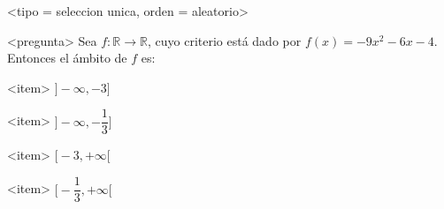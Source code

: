 <tipo = seleccion unica, orden = aleatorio>

<pregunta>
Sea $f:\mathbb R \to \mathbb R$, cuyo criterio est\'a dado por $f(x) = -9x^2 -6x -4$. Entonces el \'ambito de $f$ es:


<item>
$\bigg]{-}\infty, -3\bigg]$

<item>
$\bigg]{-}\infty, -\dfrac{1}{3}\bigg]$

<item>
$\bigg[-3, +\infty\bigg[$

<item>
$\bigg[-\dfrac{1}{3}, +\infty\bigg[$



